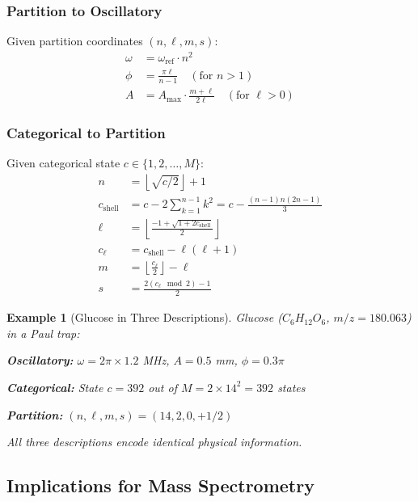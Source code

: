 \documentclass[twocolumn,10pt]{article}
\newtheorem{example}[theorem]{Example}
\begin{document}
\subsubsection{Partition to Oscillatory}

Given partition coordinates $(n, \ell, m, s)$:
\begin{align}
\omega &= \omega_{\mathrm{ref}} \cdot n^2 \\
\phi &= \frac{\pi \ell}{n-1} \quad (\text{for } n > 1) \\
A &= A_{\max} \cdot \frac{m + \ell}{2\ell} \quad (\text{for } \ell > 0)
\end{align}

\subsubsection{Categorical to Partition}

Given categorical state $c \in \{1, 2, \ldots, M\}$:
\begin{align}
n &= \left\lfloor \sqrt{c/2} \right\rfloor + 1 \\
c_{\mathrm{shell}} &= c - 2\sum_{k=1}^{n-1} k^2 = c - \frac{(n-1)n(2n-1)}{3} \\
\ell &= \left\lfloor \frac{-1 + \sqrt{1 + 2c_{\mathrm{shell}}}}{2} \right\rfloor \\
c_{\ell} &= c_{\mathrm{shell}} - \ell(\ell+1) \\
m &= \left\lfloor \frac{c_{\ell}}{2} \right\rfloor - \ell \\
s &= \frac{2(c_{\ell} \mod 2) - 1}{2}
\end{align}

\begin{example}[Glucose in Three Descriptions]
\label{ex:glucose_triple}
Glucose ($C_6H_{12}O_6$, $m/z = 180.063$) in a Paul trap:

\textbf{Oscillatory:} $\omega = 2\pi \times 1.2$ MHz, $A = 0.5$ mm, $\phi = 0.3\pi$

\textbf{Categorical:} State $c = 392$ out of $M = 2 \times 14^2 = 392$ states

\textbf{Partition:} $(n, \ell, m, s) = (14, 2, 0, +1/2)$

All three descriptions encode identical physical information.
\end{example}

\subsection{Implications for Mass Spectrometry}
\end{document}
